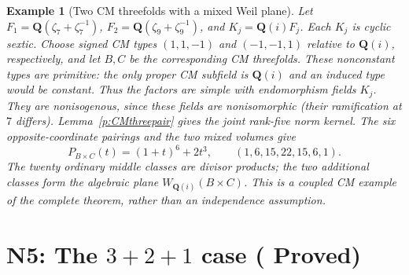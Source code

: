 \documentclass[10pt,reqno]{article}
\theoremstyle{emphasizedplain}
\DeclareRobustCommand{\provedstatus}{%
  \texorpdfstring{\textcolor{ProvedGreen}{\textbf{Proved}}}{Proved}}
\theoremstyle{emphasizeddefinition}
\newtheorem{example}[theorem]{Example}
\theoremstyle{emphasizeddefinition}
\newcommand{\Q}{\mathbf Q}
\begin{document}
\begin{example}[Two CM threefolds with a mixed Weil plane]
Let $F_1=\Q(\zeta_7+\zeta_7^{-1})$,
$F_2=\Q(\zeta_9+\zeta_9^{-1})$, and $K_j=\Q(i)F_j$.
Each $K_j$ is cyclic sextic. Choose signed CM types $(1,1,-1)$ and
$(-1,-1,1)$ relative to $\Q(i)$, respectively, and let $B,C$ be the
corresponding CM threefolds. These nonconstant types are primitive:
the only proper CM subfield is $\Q(i)$ and an induced type would be
constant. Thus the factors are simple with endomorphism fields $K_j$.
They are nonisogenous, since these fields are nonisomorphic (their
ramification at $7$ differs). Lemma~\ref{p:CMthreepair} gives the joint
rank-five norm kernel. The six opposite-coordinate pairings and the
two mixed volumes give
\[
 P_{B\times C}(t)=(1+t)^6+2t^3,
 \qquad (1,6,15,22,15,6,1).
\]
The twenty ordinary middle classes are divisor products; the two
additional classes form the algebraic plane $W_{\Q(i)}(B\times C)$.
This is a coupled CM example of the complete theorem, rather than
an independence assumption.
\end{example}
\section{N5: The \texorpdfstring{$3+2+1$}{3+2+1} case (\provedstatus)}\label{sec:N5}
\end{document}
